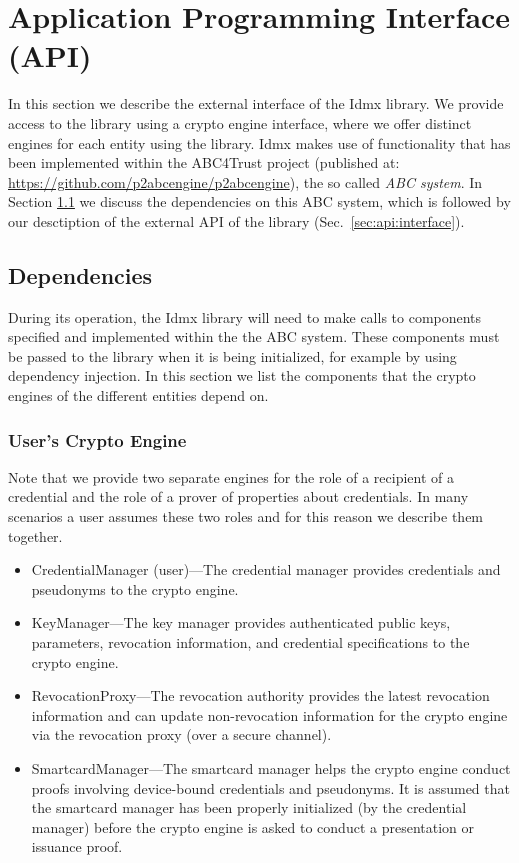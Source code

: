 
\section{Application Programming Interface (API)}
\label{sec:api}

In this section we describe the external interface of the Idmx library.
We provide access to the library using a crypto engine interface, where we offer distinct 
engines for each entity using the library.
Idmx makes use of functionality that has been implemented within the ABC4Trust project 
(published at: \url{https://github.com/p2abcengine/p2abcengine}), the so called \emph{ABC system}.
In Section \ref{sec:api:dep} we discuss the dependencies on this ABC system, which is followed by
our desctiption of the external API of the library (Sec.~\ref{sec:api:interface}).



  \subsection{Dependencies}
  \label{sec:api:dep}
  During its operation, the Idmx library will need to make calls to components 
  specified and implemented within the the ABC system.
  These components must be passed to the library when it is being initialized,
  for example by using dependency injection.
  In this section we list the components that the crypto engines of the different entities depend on.

  \subsubsection{User's Crypto Engine}
  
  Note that we provide two separate engines for the role of a recipient of a credential 
  and the role of a prover of properties about credentials.
  In many scenarios a user assumes these two roles and for this reason we describe them 
  together.
  
  \begin{itemize}
    \item CredentialManager (user)---The credential manager provides credentials and pseudonyms to the crypto engine.
    \item KeyManager---The key manager provides authenticated public keys, parameters, revocation information, and credential specifications
      to the crypto engine.
    \item RevocationProxy---The revocation authority provides the latest revocation information and can update non-revocation information
      for the crypto engine via the revocation proxy (over a secure channel).
    \item SmartcardManager---The smartcard manager helps the crypto engine conduct proofs involving device-bound credentials and pseudonyms. It
    is assumed that the smartcard manager has been properly initialized (by the credential manager) before the crypto engine is asked to
    conduct a presentation or issuance proof.
  \end{itemize}

